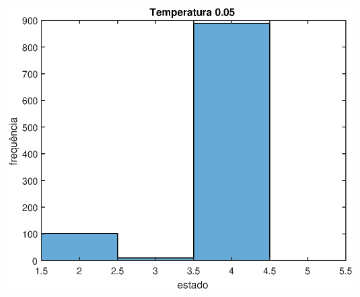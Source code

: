 \documentclass[12pt]{article}
\newenvironment{exercise}[2][Exercício]{\begin{trivlist}
\item[\hskip \labelsep {\bfseries #1}\hskip \labelsep {\bfseries #2.}]}{\end{trivlist}}
\begin{document}
\begin{exercise}{2.e}
\begin{figure}[H]
\begin{subfigure}[b]{0.3\textwidth}
        \includegraphics[width=\textwidth]{figs/ex2e_h3.eps}
    \end{subfigure}
\end{figure}


\end{exercise}
\end{document}
